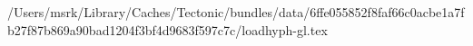 /Users/msrk/Library/Caches/Tectonic/bundles/data/6ffe055852f8faf66c0acbe1a7fb27f87b869a90bad1204f3bf4d9683f597c7c/loadhyph-gl.tex
